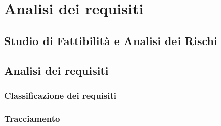 \section{Analisi dei requisiti}
	\subsection{Studio di Fattibilità e Analisi dei Rischi}
	\subsection{Analisi dei requisiti}
		\subsubsection{Classificazione dei requisiti}
		\subsubsection{Tracciamento}

